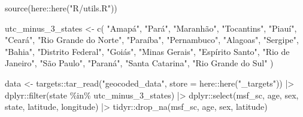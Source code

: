 \documentclass[
12pt,
openright,
oneside,
a4paper,
chapter=TITLE,
section=TITLE,
french,
spanish,
brazil,
english
]{abntex2}\usepackage{array}
\newenvironment{Shaded}{\begin{snugshade}}{\end{snugshade}}
\newcommand{\AttributeTok}[1]{\textcolor[rgb]{0.40,0.45,0.13}{#1}}
\newcommand{\ConstantTok}[1]{\textcolor[rgb]{0.56,0.35,0.01}{#1}}
\newcommand{\FloatTok}[1]{\textcolor[rgb]{0.68,0.00,0.00}{#1}}
\newcommand{\FunctionTok}[1]{\textcolor[rgb]{0.28,0.35,0.67}{#1}}
\newcommand{\NormalTok}[1]{\textcolor[rgb]{0.00,0.23,0.31}{#1}}
\newcommand{\OtherTok}[1]{\textcolor[rgb]{0.00,0.23,0.31}{#1}}
\newcommand{\SpecialCharTok}[1]{\textcolor[rgb]{0.37,0.37,0.37}{#1}}
\newcommand{\StringTok}[1]{\textcolor[rgb]{0.13,0.47,0.30}{#1}}
\begin{document}
\begin{Shaded}
\begin{Highlighting}[numbers=left,,]
\FunctionTok{source}\NormalTok{(here}\SpecialCharTok{::}\FunctionTok{here}\NormalTok{(}\StringTok{"R/utils.R"}\NormalTok{))}

\NormalTok{utc\_minus\_3\_states }\OtherTok{\textless{}{-}} \FunctionTok{c}\NormalTok{(}
  \StringTok{"Amapá"}\NormalTok{, }\StringTok{"Pará"}\NormalTok{, }\StringTok{"Maranhão"}\NormalTok{, }\StringTok{"Tocantins"}\NormalTok{, }\StringTok{"Piauí"}\NormalTok{, }\StringTok{"Ceará"}\NormalTok{,}
  \StringTok{"Rio Grande do Norte"}\NormalTok{, }\StringTok{"Paraíba"}\NormalTok{, }\StringTok{"Pernambuco"}\NormalTok{, }\StringTok{"Alagoas"}\NormalTok{, }\StringTok{"Sergipe"}\NormalTok{,}
  \StringTok{"Bahia"}\NormalTok{, }\StringTok{"Distrito Federal"}\NormalTok{, }\StringTok{"Goiás"}\NormalTok{, }\StringTok{"Minas Gerais"}\NormalTok{, }\StringTok{"Espírito Santo"}\NormalTok{,}
  \StringTok{"Rio de Janeiro"}\NormalTok{, }\StringTok{"São Paulo"}\NormalTok{, }\StringTok{"Paraná"}\NormalTok{, }\StringTok{"Santa Catarina"}\NormalTok{,}
  \StringTok{"Rio Grande do Sul"}
\NormalTok{)}

\NormalTok{data }\OtherTok{\textless{}{-}} 
\NormalTok{  targets}\SpecialCharTok{::}\FunctionTok{tar\_read}\NormalTok{(}\StringTok{"geocoded\_data"}\NormalTok{, }\AttributeTok{store =}\NormalTok{ here}\SpecialCharTok{::}\FunctionTok{here}\NormalTok{(}\StringTok{"\_targets"}\NormalTok{)) }\SpecialCharTok{|\textgreater{}}
\NormalTok{  dplyr}\SpecialCharTok{::}\FunctionTok{filter}\NormalTok{(state }\SpecialCharTok{\%in\%}\NormalTok{ utc\_minus\_3\_states) }\SpecialCharTok{|\textgreater{}}
\NormalTok{  dplyr}\SpecialCharTok{::}\FunctionTok{select}\NormalTok{(msf\_sc, age, sex, state, latitude, longitude) }\SpecialCharTok{|\textgreater{}}
\NormalTok{  tidyr}\SpecialCharTok{::}\FunctionTok{drop\_na}\NormalTok{(msf\_sc, age, sex, latitude)}
\end{Highlighting}
\end{Shaded}

\begin{Shaded}
\end{Shaded}
\end{document}
